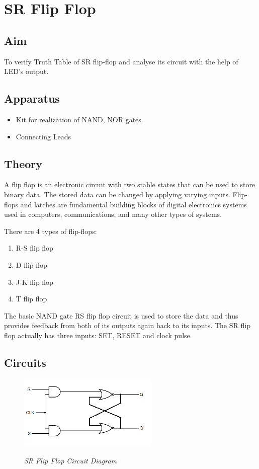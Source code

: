\chapter{SR Flip Flop}

\section{Aim}
To verify Truth Table of SR flip-flop and analyse its circuit with the help of LED's output.

\section{Apparatus}
\begin{itemize}
	\tightlist
	\item Kit for realization of NAND, NOR gates.
	\item Connecting Leads
\end{itemize}

\section{Theory}
A flip flop is an electronic circuit with two stable states that can be used to store binary data. The stored data can be changed by applying varying inputs. Flip-flops and latches are fundamental building blocks of digital electronics systems used in computers, communications, and many other types of systems.

There are 4 types of flip-flops:
\begin{enumerate}
	\tightlist
	\item R-S flip flop
	\item D flip flop
	\item J-K flip flop
	\item T flip flop
\end{enumerate}

The basic NAND gate RS flip flop circuit is used to store the data and thus provides feedback from both of its outputs again back to its inputs. The SR flip flop actually has three inputs: SET, RESET and clock pulse.

\section{Circuits}
	\begin{figure}[ht]
		\centering
		\includegraphics[width=0.6\textwidth,valign=c]{img/exp5/fig1}
		\label{fig:SR_flipflop_circuit}		
		\caption{\textit{SR Flip Flop Circuit Diagram}}
	\end{figure}


